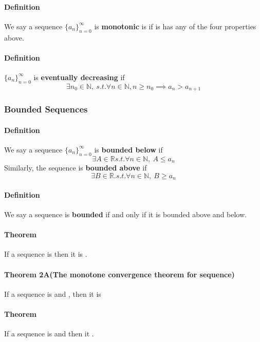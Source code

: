 \documentclass{article}
\begin{document}
\paragraph{Definition} We say a sequence $\{a_n\}_{n=0}^{\infty}$ is \textbf{monotonic} is if is has any of the four properties above.

\paragraph{Definition} $\{a_n\}_{n=0}^{\infty}$ is \textbf{eventually decreasing} if 
\[
	\exists n_0 \in \mathbb{N},\ s.t. \forall n\in \mathbb{N}, n \geq n_0 \implies a_n > a_{n+1}
\]

\subsubsection{Bounded Sequences}
\paragraph{Definition} We say a sequence $\{a_n\}_{n=0}^{\infty}$ is \textbf{bounded below} if 
\[
	\exists A \in \mathbb{R} s.t. \forall n \in \mathbb{N},\ A \leq a_n
\]
Similarly, the sequence is \textbf{bounded above} if
\[
	\exists B \in \mathbb{R}. s.t. \forall n \in \mathbb{N},\ B \geq a_n
\]

\paragraph{Definition} We say a sequence is \textbf{bounded} if and only if it is  bounded above and below.

\paragraph{Theorem} If a sequence is  then it is .

\paragraph{Theorem 2A(The monotone convergence theorem for sequence)} If a sequence is  and , then it is 

\paragraph{Theorem} If a sequence is  and  then it .
\end{document}
